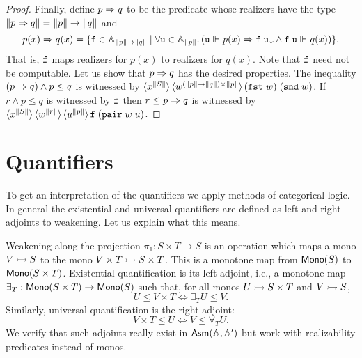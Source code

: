 \begin{proof}
  Finally, define $p \Rightarrow q$ to be the predicate whose realizers have
  the type $\|p \Rightarrow q\| = \|p\| \to \|q\|$ and
  \begin{equation*}
    p(x) \Rightarrow q(x) = \{
      \mathtt{f} \in \mathbb{A}_{\|p\| \to \|q\|} \mid
      \forall \mathtt{u} \in \mathbb{A}_{\|p\|} .\,
        (\mathtt{u} \Vdash_{} p(x)
        \Rightarrow
        \mathtt{f}\;\mathtt{u}{\downarrow} \land
        \mathtt{f}\;\mathtt{u} \Vdash_{} q(x))
    \}.
  \end{equation*}
  That is, $\mathtt{f}$ maps realizers for $p(x)$ to realizers for $q(x)$.
  Note that $\mathtt{f}$ need not be computable. Let us show that $p \Rightarrow
  q$ has the desired properties. The inequality $(p \Rightarrow q) \land p
  \leq q$ is witnessed by $\langle x^{\|S\|} \rangle\, \langle w^{(\|p\| \to
      \|q\|) \times \|p\|} \rangle\,{(\mathtt{fst}\;w)\; (\mathtt{snd}\;w)}$. If $r \land p
  \leq q$ is witnessed by $\mathtt{f}$ then $r \leq p \Rightarrow q$ is witnessed
  by $\langle x^{\|S\|} \rangle\, \langle w^{\|r\|} \rangle\,
    \langle u^{\|p\|} \rangle\, \mathtt{f}\;(\mathtt{pair}\;w\;u)$.
\end{proof}

\section{Quantifiers}
\label{sec:quantifiers}

To get an interpretation of the quantifiers we apply methods of
categorical logic. In general the existential and universal
quantifiers are defined as left and right adjoints to weakening. Let
us explain what this means.

Weakening along the projection $\pi_1 : S \times T \to
S$ is an operation which maps a mono $V \rightarrowtail S$
to the mono $V \times T \rightarrowtail S \times T$.
This is a monotone map from $\mathsf{Mono}(S)$ to $\mathsf{Mono}(S \times
  T)$. Existential quantification is its left adjoint, i.e., a
monotone map $\exists_{T} : \mathsf{Mono}(S \times T) \to
\mathsf{Mono}(S)$ such that, for all monos $U \rightarrowtail S
\times T$ and $V \rightarrowtail S$,
%
\begin{equation*}
  U \leq V \times T
  \iff
  \exists_{T} U \leq V.
\end{equation*}
%
Similarly, universal quantification is the right adjoint:
%
\begin{equation*}
  V \times T \leq U
  \iff
  V \leq \forall_{T} U.
\end{equation*}
%
We verify that such adjoints really exist in $\mathsf{Asm}(\mathbb{A},\mathbb{A}')$ but work with
realizability predicates instead of monos.

